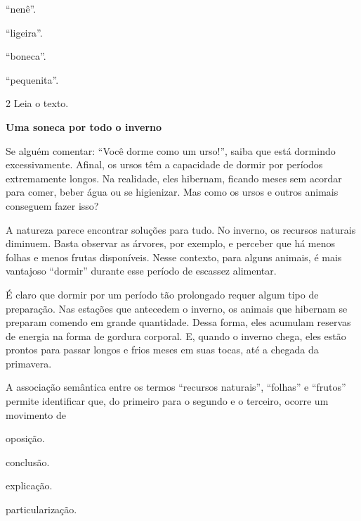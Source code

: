 \begin{escolha}
\item ``nenê''.

\item ``ligeira''.

\item ``boneca''.

\item ``pequenita''.
\end{escolha}

\num{2} Leia o texto.

\begin{myquote}
\textbf{Uma soneca por todo o inverno}

Se alguém comentar: ``Você dorme como um urso!'', saiba que está
dormindo excessivamente. Afinal, os ursos têm a capacidade de dormir por
períodos extremamente longos. Na realidade, eles hibernam, ficando meses
sem acordar para comer, beber água ou se higienizar. Mas como os ursos e
outros animais conseguem fazer isso?

A natureza parece encontrar soluções para tudo. No inverno, os recursos
naturais diminuem. Basta observar as árvores, por exemplo, e perceber
que há menos folhas e menos frutas disponíveis. Nesse contexto, para
alguns animais, é mais vantajoso ``dormir'' durante esse período de
escassez alimentar.

É claro que dormir por um período tão prolongado requer algum tipo de
preparação. Nas estações que antecedem o inverno, os animais que
hibernam se preparam comendo em grande quantidade. Dessa forma, eles
acumulam reservas de energia na forma de gordura corporal. E, quando o
inverno chega, eles estão prontos para passar longos e frios meses em
suas tocas, até a chegada da primavera.
\end{myquote}


A associação semântica entre os termos ``recursos naturais'', ``folhas''
e ``frutos'' permite identificar que, do primeiro para o segundo e o
terceiro, ocorre um movimento de

\begin{escolha}
\item oposição.

\item conclusão.

\item explicação.

\item particularização.
\end{escolha}

